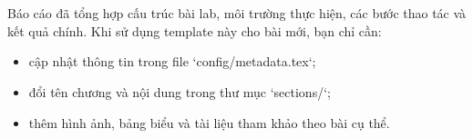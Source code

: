 \section{\sectionconclusiontitle}
Báo cáo đã tổng hợp cấu trúc bài lab, môi trường thực hiện, các bước thao tác và kết quả chính. Khi sử dụng template này cho bài mới, bạn chỉ cần:
\begin{itemize}[leftmargin=2em]
    \item cập nhật thông tin trong file `config/metadata.tex`;
    \item đổi tên chương và nội dung trong thư mục `sections/`;
    \item thêm hình ảnh, bảng biểu và tài liệu tham khảo theo bài cụ thể.
\end{itemize}
